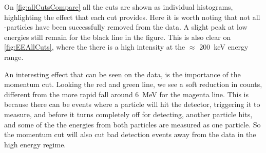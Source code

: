 On \cref{fig:allCutsCompare} all the cuts are shown as individual histograms, highlighting the effect that each cut provides. Here it is worth noting that not all \be-particles have been successfully removed from the data. A slight peak at low energies still remain for the black line in the figure. This is also clear on \cref{fig:EEAllCuts}, where the there is a high intensity at the $\approx$ \SI{200}{keV} energy range. 

An interesting effect that can be seen on the data, is the importance of the momentum cut. Looking the red and green line, we see a soft reduction in counts, different from the more rapid fall around \SI{6}{MeV} for the magenta line. This is because there can be events where a particle will hit the detector, triggering it to measure, and before it turns completely off for detecting, another particle hits, and some of the the energies from both particles are measured as one particle. 
So the momentum cut will also cut bad detection events away from the data in the high energy regime. 



